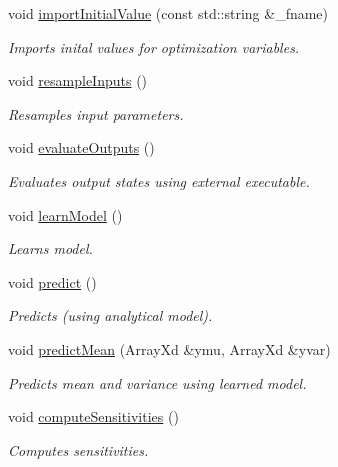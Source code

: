 \begin{DoxyCompactItemize}
void \hyperlink{class_go_s_u_m_1_1_c_container_ade21d5810c661e695dfcc15e801a3282}{import\-Initial\-Value} (const std\-::string \&\-\_\-fname)
\begin{DoxyCompactList}\small\item\em Imports inital values for optimization variables. \end{DoxyCompactList}\item 
void \hyperlink{class_go_s_u_m_1_1_c_container_acc0b74915eadfc081735860c2611b818}{resample\-Inputs} ()
\begin{DoxyCompactList}\small\item\em Resamples input parameters. \end{DoxyCompactList}\item 
void \hyperlink{class_go_s_u_m_1_1_c_container_ae1811c5957b8dda68a7aacb507b39d16}{evaluate\-Outputs} ()
\begin{DoxyCompactList}\small\item\em Evaluates output states using external executable. \end{DoxyCompactList}\item 
void \hyperlink{class_go_s_u_m_1_1_c_container_af9ad216aef4fa11d5a3bfaf388e37608}{learn\-Model} ()
\begin{DoxyCompactList}\small\item\em Learns model. \end{DoxyCompactList}\item 
void \hyperlink{class_go_s_u_m_1_1_c_container_a2f3c28757a614f4f51c059965fe5d874}{predict} ()
\begin{DoxyCompactList}\small\item\em Predicts (using analytical model). \end{DoxyCompactList}\item 
void \hyperlink{class_go_s_u_m_1_1_c_container_a3e52f16e061cdb5475c2815ea790013f}{predict\-Mean} (Array\-Xd \&ymu, Array\-Xd \&yvar)
\begin{DoxyCompactList}\small\item\em Predicts mean and variance using learned model. \end{DoxyCompactList}\item 
void \hyperlink{class_go_s_u_m_1_1_c_container_ae0a6897c8af924d015b2517e78e86a15}{compute\-Sensitivities} ()
\begin{DoxyCompactList}\small\item\em Computes sensitivities. \end{DoxyCompactList}\item 

\end{DoxyCompactItemize}
